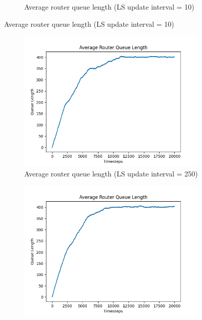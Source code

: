 \begin{appendices}
\begin{figure}[h]
\begin{subfigure}[b]{0.475\textwidth}
            \caption[]{Average router queue length (LS update interval = 10)}
        \end{subfigure}
    \end{figure}
    \begin{figure}[H]\ContinuedFloat
        \centering
        \begin{subfigure}[b]{0.475\textwidth}
            \centering
            \includegraphics[width=\textwidth]{figs/appendix/average_ls=50.png}
            \caption[]{Average router queue length (LS update interval = 250)}
        \end{subfigure}
        \hfill
        \begin{subfigure}[b]{0.475\textwidth}
            \centering
            \includegraphics[width=\textwidth]{figs/appendix/average_ls=500.png}

\end{subfigure}
\end{figure}
\end{appendices}
